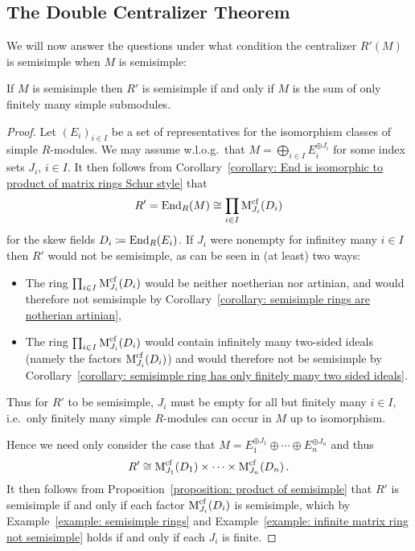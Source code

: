 \subsection{The Double Centralizer Theorem}


\begin{fluff}
  We will now answer the questions under what condition the centralizer $R'(M)$ is semisimple when $M$ is semisimple:
\end{fluff}


\begin{proposition}
  If $M$ is semisimple then $R'$ is semisimple if and only if $M$ is the sum of only finitely many simple submodules.
\end{proposition}


\begin{proof}
  Let $(E_i)_{i \in I}$ be a set of representatives for the isomorphism classes of simple $R$-modules.
  We may assume w.l.o.g.\ that $M = \bigoplus_{i \in I} E_i^{\oplus J_i}$ for some index sets $J_i$, $i \in I$.
  It then follows from Corollary~\ref{corollary: End is isomorphic to product of matrix rings Schur style} that
  \[
          R'
    =     \operatorname{End}_R(M)
    \cong \prod_{i \in I} \operatorname{M}_{J_i}^{{\operatorname{cf}}}(D_i)
  \]
  for the skew fields $D_i \coloneqq \operatorname{End}_R(E_i)$.
  If $J_i$ were nonempty for infinitey many $i \in I$ then $R'$ would not be semisimple, as can be seen in (at least) two ways:
  \begin{itemize}
    \item
      The ring $\prod_{i \in I} \operatorname{M}_{J_i}^{{\operatorname{cf}}}(D_i)$ would be neither noetherian nor artinian, and would therefore not semisimple by Corollary~\ref{corollary: semisimple rings are notherian artinian},
    \item
      The ring $\prod_{i \in I} \operatorname{M}_{J_i}^{{\operatorname{cf}}}(D_i)$ would contain infinitely many two-sided ideals (namely the factors $\operatorname{M}_{J_i}^{{\operatorname{cf}}}(D_i)$) and would therefore not be semisimple by Corollary~\ref{corollary: semisimple ring has only finitely many two sided ideals}.
  \end{itemize}
  Thus for $R'$ to be semisimple, $J_i$ must be empty for all but finitely many $i \in I$, i.e.\ only finitely many simple $R$-modules can occur in $M$ up to isomorphism.
  
  Hence we need only consider the case that $M = E_1^{\oplus J_1} \oplus \dotsb \oplus E_n^{\oplus J_n}$ and thus
  \[
          R'
    \cong \operatorname{M}_{J_1}^{{\operatorname{cf}}}(D_1) \times \dotsb \times \operatorname{M}_{J_n}^{{\operatorname{cf}}}(D_n) \,.
  \]
  It then follows from Proposition~\ref{proposition: product of semisimple} that $R'$ is semisimple if and only if each factor $\operatorname{M}_{J_i}^{{\operatorname{cf}}}(D_i)$ is semisimple, which by Example~\ref{example: semisimple rings} and Example~\ref{example: infinite matrix ring not semisimple} holds if and only if each $J_i$ is finite.
\end{proof}


